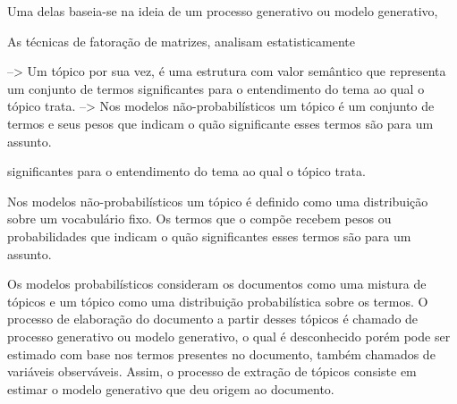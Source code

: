 

Uma delas baseia-se na ideia de um processo generativo ou modelo generativo, 

As técnicas de fatoração de matrizes, analisam estatisticamente 




--> Um tópico por sua vez, é uma estrutura com valor semântico que representa um conjunto de termos significantes para o entendimento do tema ao qual o tópico trata.
--> Nos modelos não-probabilísticos um tópico é um conjunto de termos e seus pesos que indicam o quão significante esses termos são para um assunto.

significantes para o entendimento do tema ao qual o tópico trata.






Nos modelos não-probabilísticos um tópico é definido como uma distribuição sobre um vocabulário fixo. Os termos que o compõe recebem pesos ou probabilidades que indicam o quão significantes esses termos são para um assunto.








Os modelos probabilísticos consideram os documentos como uma mistura de tópicos e um tópico como uma distribuição probabilística sobre os termos. O processo de elaboração do documento a partir desses tópicos é chamado de processo generativo ou modelo generativo, o qual é desconhecido porém pode ser estimado com base nos termos presentes no documento, também chamados de variáveis observáveis. Assim, o processo de extração de tópicos consiste em estimar o modelo generativo que deu origem ao documento.


















